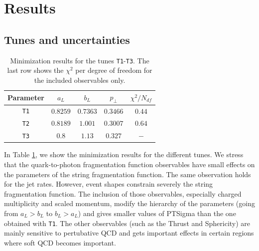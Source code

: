 \documentclass[aps,preprint,floatfix,nofootinbib,showpacs]{revtex4-1}
\begin{document}
\section{Results}
\label{Section4}

\subsection{Tunes and uncertainties}

\begin{table}[!h]
 \begin{center}
  \begin{tabular}{ c | c | c | c | c }
  \hline \hline
   Parameter   & \hspace{0.8cm} $a_L$  \hspace{0.8cm} & \hspace{0.8cm} $b_L$  \hspace{0.8cm} & \hspace{0.8cm} $p_\perp$ \hspace{0.8cm}  & \hspace{0.8cm} $\chi^2/N_{df}$ \hspace{0.8cm} \\ \hline
   \texttt{T1} & $0.8259$      & $0.7363$  & $0.3466$  & $0.44$          \\ \hline
   \texttt{T2} & $0.8189$      & $1.001$  & $0.3007$  & $0.64$          \\ \hline
   \texttt{T3} & $0.8$         & $1.13$    & $0.327$   & $-$           \\ \hline \hline
  \end{tabular}
 \end{center}
 \caption{Minimization results for the tunes \texttt{T1}-\texttt{T3}. 
 The last row shows the $\chi^2$ per degree of freedom for the included observables only.}
 \label{Table.tunes}
\end{table}

In Table \ref{Table.tunes}, we show 
the minimization results for the different tunes. We stress
that the quark-to-photon fragmentation
function observables have small effects on the parameters of the string 
fragmentation function. The same observation holds for the jet rates. 
However, event shapes constrain severely the string fragmentation function. 
The inclusion of those  observables, especially charged multiplicity 
and scaled momentum, modify the hierarchy of the parameters 
(going from $a_L > b_L$ to $b_L > a_L$) and gives smaller 
values of \textsf{PTSigma} than the one obtained with 
\texttt{T1}. The other observables (such
as the Thrust and Sphericity) are mainly sensitive 
to pertubative QCD and gets important effects in certain
regions where soft QCD becomes important. 
\end{document}
